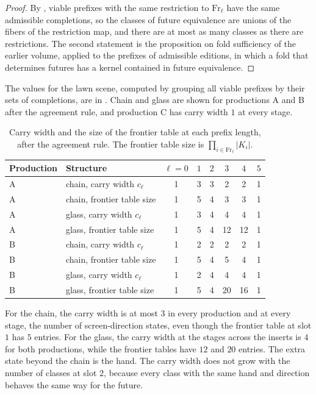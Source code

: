 \documentclass[11pt,twoside,openright]{book}
\theoremstyle{plain}
\theoremstyle{definition}
\theoremstyle{remark}
\newcommand{\Fr}{\mathrm{Fr}}
\begin{document}
\begin{proof}
By , viable prefixes with the same restriction to $\Fr_\ell$ have the same admissible completions, so the classes of future equivalence are unions of the fibers of the restriction map, and there are at most as many classes as there are restrictions. The second statement is the proposition on fold sufficiency of the earlier volume, applied to the prefixes of admissible editions, in which a fold that determines futures has a kernel contained in future equivalence.
\end{proof}

The values for the lawn scene, computed by grouping all viable prefixes by their sets of completions, are in . Chain and glass are shown for productions A and B after the agreement rule, and production C has carry width $1$ at every stage.

\begin{table}[ht]
\centering
\begin{tabular}{@{}llcccccc@{}}
\toprule
Production & Structure & $\ell=0$ & $1$ & $2$ & $3$ & $4$ & $5$\\
\midrule
A & chain, carry width $c_\ell$ & 1 & 3 & 3 & 2 & 2 & 1\\
A & chain, frontier table size & 1 & 5 & 4 & 3 & 3 & 1\\
A & glass, carry width $c_\ell$ & 1 & 3 & 4 & 4 & 4 & 1\\
A & glass, frontier table size & 1 & 5 & 4 & 12 & 12 & 1\\
\midrule
B & chain, carry width $c_\ell$ & 1 & 2 & 2 & 2 & 2 & 1\\
B & chain, frontier table size & 1 & 5 & 4 & 5 & 4 & 1\\
B & glass, carry width $c_\ell$ & 1 & 2 & 4 & 4 & 4 & 1\\
B & glass, frontier table size & 1 & 5 & 4 & 20 & 16 & 1\\
\bottomrule
\end{tabular}
\caption{Carry width and the size of the frontier table at each prefix length, after the agreement rule. The frontier table size is $\prod_{i\in\Fr_\ell}\lvert K_i\rvert$.}\label{tab:carry}
\end{table}

For the chain, the carry width is at most $3$ in every production and at every stage, the number of screen-direction states, even though the frontier table at slot $1$ has $5$ entries. For the glass, the carry width at the stages across the inserts is $4$ for both productions, while the frontier tables have $12$ and $20$ entries. The extra state beyond the chain is the hand. The carry width does not grow with the number of classes at slot $2$, because every class with the same hand and direction behaves the same way for the future.
\end{document}

